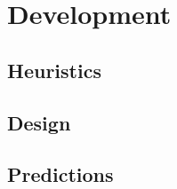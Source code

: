 \chapter{Development}
\label{ch:Development}

\section{Heuristics}
\label{sec:Heuristics}



\section{Design}
\label{sec:Design}

\section{Predictions}
\label{sec:Predictions}

\endinput

Any text after an \endinput is ignored.
You could put scraps here or things in progress.